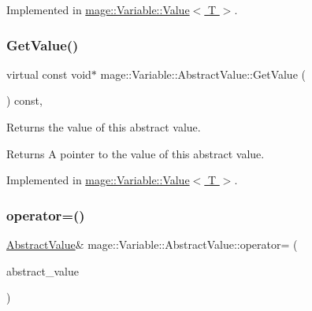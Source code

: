 Implemented in \hyperlink{structmage_1_1_variable_1_1_value_a4d59fec74fc5d25ecca86054ecc8d15d}{mage\+::\+Variable\+::\+Value$<$ T $>$}.

\hypertarget{structmage_1_1_variable_1_1_abstract_value_a857f4e519084841c3dac837771114924}{}\label{structmage_1_1_variable_1_1_abstract_value_a857f4e519084841c3dac837771114924} 
\subsubsection{\texorpdfstring{Get\+Value()}{GetValue()}}
{\footnotesize\ttfamily virtual const void$\ast$ mage\+::\+Variable\+::\+Abstract\+Value\+::\+Get\+Value (\begin{DoxyParamCaption}{ }\end{DoxyParamCaption}) const\hspace{0.3cm}{\ttfamily [pure virtual]}, {\ttfamily [noexcept]}}

Returns the value of this abstract value.

\begin{DoxyReturn}{Returns}
A pointer to the value of this abstract value. 
\end{DoxyReturn}


Implemented in \hyperlink{structmage_1_1_variable_1_1_value_af560f450757bd5b40871162cbaf911b3}{mage\+::\+Variable\+::\+Value$<$ T $>$}.

\hypertarget{structmage_1_1_variable_1_1_abstract_value_a77f7107e78716a0ea76cfaedd0a50a4b}{}\label{structmage_1_1_variable_1_1_abstract_value_a77f7107e78716a0ea76cfaedd0a50a4b} 
\subsubsection{\texorpdfstring{operator=()}{operator=()}\hspace{0.1cm}{\footnotesize\ttfamily [1/2]}}
{\footnotesize\ttfamily \hyperlink{structmage_1_1_variable_1_1_abstract_value}{Abstract\+Value}\& mage\+::\+Variable\+::\+Abstract\+Value\+::operator= (\begin{DoxyParamCaption}\item[{const \hyperlink{structmage_1_1_variable_1_1_abstract_value}{Abstract\+Value} \&}]{abstract\+\_\+value }\end{DoxyParamCaption})\hspace{0.3cm}{\ttfamily [delete]}}

